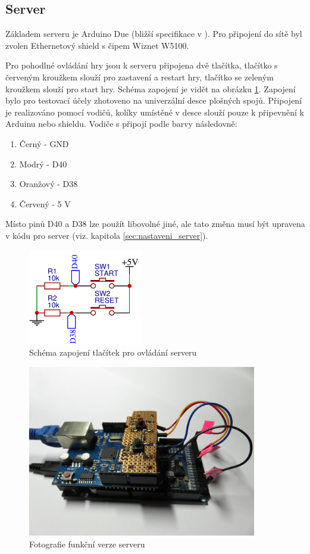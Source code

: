\documentclass[a4paper,12pt, twoside]{article} %
\begin{document}
\subsection{Server}
\label{sec:server}
Základem serveru je Arduino Due (bližší specifikace v \cite{ArduinoDue_page}). Pro připojení do sítě byl zvolen Ethernetový shield s čipem Wiznet W5100. 

Pro pohodlné ovládání hry jsou k serveru připojena dvě tlačítka, tlačítko s červeným kroužkem slouží pro zastavení a restart hry, tlačítko se zeleným kroužkem slouží pro start hry. Schéma zapojení je vidět na obrázku \ref{fig:server_switch_module}. Zapojení bylo pro testovací účely zhotoveno na univerzální desce plošných spojů. Připojení je realizováno pomocí vodičů, kolíky umístěné v desce slouží pouze k připevnění k Arduinu nebo shieldu. Vodiče s připojí podle barvy následovně: 
\begin{enumerate}
\item Černý - GND
\item Modrý - D40
\item Oranžový - D38
\item Červený - 5 V
\end{enumerate}
Místo pinů D40 a D38 lze použít libovolné jiné, ale tato změna musí být upravena v kódu pro server (viz. kapitola \ref{sec:nastaveni_server}).
\begin{figure}[hbtp]
\centering
\includegraphics[width=5cm]{img/schema/server_switch_module.png}
\caption{\label{fig:server_switch_module}Schéma zapojení tlačítek pro ovládání serveru}
\end{figure}
\begin{figure}[hbtp]
\centering
\includegraphics[width=10cm]{img/foto/HW_server.jpg}
\caption{\label{fig:HW_server}Fotografie funkční verze serveru}
\end{figure}
\end{document}
